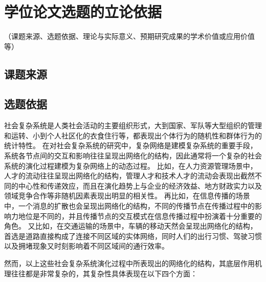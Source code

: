 

\section{学位论文选题的立论依据}

（课题来源、选题依据、理论与实际意义、预期研究成果的学术价值或应用价值等）

\subsection{课题来源}



\subsection{选题依据}

社会复杂系统是人类社会活动的主要组织形式，大到国家、军队等大型组织的管理和运转、小到个人社区化的衣食住行等，都表现出个体行为的随机性和群体行为的统计特性。
在对社会复杂系统的研究中，复杂网络是建模复杂系统的重要手段，
系统各节点间的交互和影响往往呈现出网络化的结构，因此通常将一个复杂的社会系统的演化过程建模为复杂网络上的动态过程。
比如，在人力资源管理场景中，人才的流动往往呈现出网络化的结构，管理人才和技术人才的流动会表现出截然不同的中心性和传递效应，而且在演化趋势上与企业的经济效益、地方财政实力以及领域竞争合作等非随机因素表现出明显的相关性。
再比如，在信息传播的场景中，一个消息的扩散也会呈现出网络化的结构，不同的传播节点在传播过程中的影响力地位是不同的，并且传播节点的交互模式在信息传播过程中扮演着十分重要的角色。
又比如，在交通运输的场景中，车辆的移动天然会呈现出网络化的结构，首选是道路直接构成了连接不同区域的实体网络，同时人们的出行习惯、驾驶习惯以及拥堵现象又时刻影响着不同区域间的通行效率。

然而，以上这些社会复杂系统演化过程中所表现出的网络化的结构，其底层作用机理往往都是非常复杂的，其复杂性具体表现在以下四个方面：


